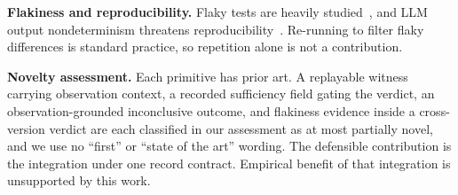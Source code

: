 \textbf{Flakiness and reproducibility.} Flaky tests are heavily studied~\cite{luo2014an,lam2019idflakies,parry2021a}, and LLM output nondeterminism threatens reproducibility~\cite{ouyang2025an}. Re-running to filter flaky differences is standard practice, so repetition alone is not a contribution.

\textbf{Novelty assessment.} Each primitive has prior art. A replayable witness carrying observation context, a recorded sufficiency field gating the verdict, an observation-grounded inconclusive outcome, and flakiness evidence inside a cross-version verdict are each classified in our assessment as at most partially novel, and we use no ``first'' or ``state of the art'' wording. The defensible contribution is the integration under one record contract. Empirical benefit of that integration is unsupported by this work.


